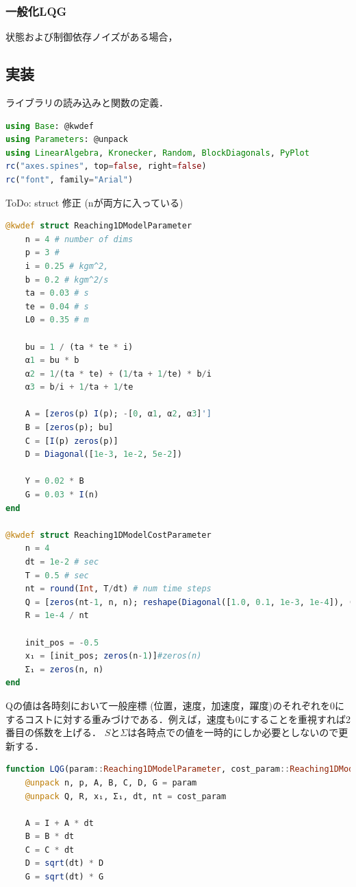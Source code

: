 \subsubsection{一般化LQG}
状態および制御依存ノイズがある場合，
\subsection{実装}
ライブラリの読み込みと関数の定義．
\begin{lstlisting}[language=julia]
using Base: @kwdef
using Parameters: @unpack
using LinearAlgebra, Kronecker, Random, BlockDiagonals, PyPlot
rc("axes.spines", top=false, right=false)
rc("font", family="Arial") 
\end{lstlisting}
\item ToDo: struct 修正 (nが両方に入っている) 
\begin{itemize}
\begin{lstlisting}[language=julia]
@kwdef struct Reaching1DModelParameter
    n = 4 # number of dims
    p = 3 # 
    i = 0.25 # kgm^2, 
    b = 0.2 # kgm^2/s
    ta = 0.03 # s
    te = 0.04 # s
    L0 = 0.35 # m

    bu = 1 / (ta * te * i)
    α1 = bu * b
    α2 = 1/(ta * te) + (1/ta + 1/te) * b/i
    α3 = b/i + 1/ta + 1/te

    A = [zeros(p) I(p); -[0, α1, α2, α3]']
    B = [zeros(p); bu]
    C = [I(p) zeros(p)]
    D = Diagonal([1e-3, 1e-2, 5e-2])

    Y = 0.02 * B
    G = 0.03 * I(n)
end

@kwdef struct Reaching1DModelCostParameter
    n = 4
    dt = 1e-2 # sec
    T = 0.5 # sec
    nt = round(Int, T/dt) # num time steps
    Q = [zeros(nt-1, n, n); reshape(Diagonal([1.0, 0.1, 1e-3, 1e-4]), (1, n, n))]
    R = 1e-4 / nt
    
    init_pos = -0.5
    x₁ = [init_pos; zeros(n-1)]#zeros(n)
    Σ₁ = zeros(n, n)
end
\end{lstlisting}
Qの値は各時刻において一般座標 (位置，速度，加速度，躍度)のそれぞれを0にするコストに対する重みづけである．例えば，速度も0にすることを重視すれば2番目の係数を上げる．
$S$と$\Sigma$は各時点での値を一時的にしか必要としないので更新する．
\begin{lstlisting}[language=julia]
function LQG(param::Reaching1DModelParameter, cost_param::Reaching1DModelCostParameter)
    @unpack n, p, A, B, C, D, G = param
    @unpack Q, R, x₁, Σ₁, dt, nt = cost_param

    A = I + A * dt
    B = B * dt
    C = C * dt
    D = sqrt(dt) * D
    G = sqrt(dt) * G
    

\end{lstlisting}
\end{itemize}

